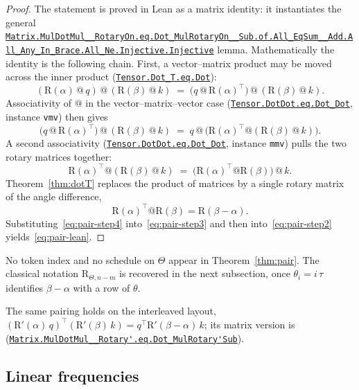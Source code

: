 \documentclass[11pt,a4paper]{article}
\newcommand{\lmod}[1]{\href{http://www.lemma.cn/lean/?module=#1}{\nolinkurl{#1}}}
\newcommand{\rot}{\mathrm{R}}
\begin{document}
\begin{proof}
The statement is proved in Lean as a matrix identity: it instantiates the general
\lmod{Matrix.MulDotMul__RotaryOn.eq.Dot_MulRotaryOn__Sub.of.All_EqSum__Add.All_Any_In_Brace.All_Ne.Injective.Injective}
lemma.
Mathematically the identity is the following chain.
First, a vector--matrix product may be moved across the inner product
(\lmod{Tensor.Dot_T.eq.Dot}):
\begin{equation}
  \label{eq:pair-step1}
  (\rot(\alpha)\,@\,q)\,@\,(\rot(\beta)\,@\,k)
  \;=\;
  \bigl(q\,@\,\rot(\alpha)^\top\bigr)\,@\,(\rot(\beta)\,@\,k).
\end{equation}
Associativity of \(@\) in the vector--matrix--vector case
(\lmod{Tensor.DotDot.eq.Dot_Dot}, instance \texttt{vmv}) then gives
\begin{equation}
  \label{eq:pair-step2}
  \bigl(q\,@\,\rot(\alpha)^\top\bigr)\,@\,(\rot(\beta)\,@\,k)
  \;=\;
  q\,@\,\bigl(\rot(\alpha)^\top @ (\rot(\beta)\,@\,k)\bigr).
\end{equation}
A second associativity
(\lmod{Tensor.DotDot.eq.Dot_Dot}, instance \texttt{mmv}) pulls the two rotary matrices together:
\begin{equation}
  \label{eq:pair-step3}
  \rot(\alpha)^\top @ (\rot(\beta)\,@\,k)
  \;=\;
  \bigl(\rot(\alpha)^\top @ \rot(\beta)\bigr)\,@\,k.
\end{equation}
Theorem~\ref{thm:dotT} replaces the product of matrices by a single rotary matrix of the angle difference,
\begin{equation}
  \label{eq:pair-step4}
  \rot(\alpha)^\top @ \rot(\beta) = \rot(\beta-\alpha).
\end{equation}
Substituting~\eqref{eq:pair-step4} into~\eqref{eq:pair-step3} and then into~\eqref{eq:pair-step2} yields~\eqref{eq:pair-lean}.
\end{proof}

No token index and no schedule on \(\Theta\) appear in Theorem~\ref{thm:pair}.
The classical notation \(\rot_{\Theta,n-m}\) is recovered in the next subsection, once \(\theta_i=i\,\tau\) identifies \(\beta-\alpha\) with a row of \(\theta\).

The same pairing holds on the interleaved layout,
\((\rot'(\alpha)\,q)^\top(\rot'(\beta)\,k)=q^\top\rot'(\beta-\alpha)\,k\);
its matrix version is
(\lmod{Matrix.MulDotMul__Rotary'.eq.Dot_MulRotary'Sub}).

\subsection{Linear frequencies}
\end{document}
